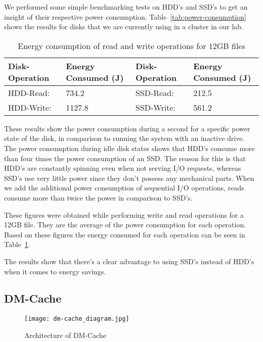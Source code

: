 We performed some simple benchmarking tests on HDD's and SSD's to get an insight
of their respective power consumption. Table~\ref{tab:power-consumption} shows
the results for disks that we are currently using in a cluster in our lab.

\begin{table}[t]
  \centering
  \resizebox{\linewidth}{!}
  {
    \begin{tabular}{|l|l|l|l|}
      \hline
      \bf Disk-Operation & \bf Energy Consumed (J) & \bf Disk-Operation & \bf
      Energy Consumed (J) \\ \hline
      HDD-Read:  & 734.2  & SSD-Read:  & 212.5 \\ \hline
      HDD-Write: & 1127.8 & SSD-Write: & 561.2 \\ \hline
    \end{tabular}
  }
  \caption{Energy consumption of read and write operations for 12GB files}
  \label{tab:energy-consumption}
\end{table}

These results show the power consumption during a second for a specific power
state of the disk, in comparison to running the system with an inactive
drive. The power consumption during idle disk states shows that HDD's consume
more than four times the power consumption of an SSD. The reason for this is
that HDD's are constantly spinning even when not serving I/O requests, whereas
SSD's use very little power since they don't possess any mechanical parts. When
we add the additional power consumption of sequential I/O operations, reads
consume more than twice the power in comparison to SSD's.

These figures were obtained while performing write and read operations for a
12GB file. They are the average of the power consumption for each
operation. Based on these figures the energy consumed for each operation can be
seen in Table~\ref{tab:energy-consumption}.

The results show that there's a clear advantage to using SSD's instead of HDD's
when it comes to energy savings.

\subsection{DM-Cache}

\begin{figure}[t]
  \centering \texttt{[image: dm-cache\_diagram.jpg]}
  \caption{Architecture of DM-Cache}
  \label{fig:dm-cache}
\end{figure}

